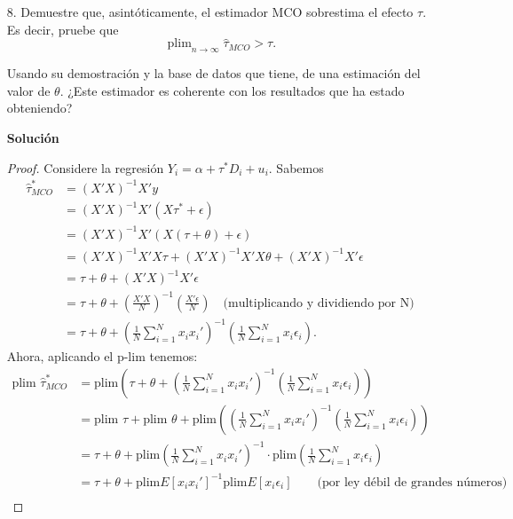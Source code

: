 \documentclass[a4paper, answers, addpoints, 11pt]{exam}
\DeclareMathOperator*{\plim}{plim}
\begin{document}
\begin{itemize}
\begin{mdframed}
        \end{mdframed}

    \item[8.] Demuestre que, asintóticamente, el estimador MCO sobrestima el efecto $\tau$. Es decir, pruebe que  
\[
\plim_{n \to \infty} \hat{\tau}_{MCO} > \tau.
\]

    Usando su demostración y la base de datos que tiene, de una estimación del valor de $\theta$. ¿Este estimador es coherente con los resultados que ha estado obteniendo?
     \begin{mdframed}
        \textbf{Solución}
        \begin{proof}
       Considere la regresión $Y_i =\alpha+ \tau^* D_i + u_i$. Sabemos 
\begin{align*}
    \hat{\tau}^*_{MCO} &=(X'X)^{-1} X' y \\
    &= (X'X)^{-1} X' (X \tau^* + \epsilon) \\
    &= (X'X)^{-1} X' (X (\tau + \theta) + \epsilon) \\
    &= (X'X)^{-1} X' X \tau + (X'X)^{-1} X' X\theta + (X'X)^{-1} X' \epsilon \\
    &= \tau + \theta + (X'X)^{-1} X' \epsilon \\
    &= \tau + \theta + \left( \frac{X'X}{N} \right)^{-1} \left( \frac{X'\epsilon}{N} \right) \quad \text{(multiplicando y dividiendo por N)} \\
    &= \tau + \theta + \left( \frac{1}{N} \sum_{i=1}^{N} x_i x_i' \right)^{-1} \left( \frac{1}{N} \sum_{i=1}^{N} x_i \epsilon_i \right).
  \end{align*}
  Ahora, aplicando el p-lim tenemos:
  \begin{align*}
    \text{plim } \hat{\tau}^*_{MCO} &= \text{plim} \left( \tau + \theta+ \left( \frac{1}{N} \sum_{i=1}^{N} x_i x_i' \right)^{-1} 
    \left( \frac{1}{N} \sum_{i=1}^{N} x_i \epsilon_i \right) \right) \\
    &= \text{plim } \tau + \text{plim } \theta +\text{plim} \left( \left( \frac{1}{N} \sum_{i=1}^{N} x_i x_i' \right)^{-1} 
    \left( \frac{1}{N} \sum_{i=1}^{N} x_i \epsilon_i \right) \right) \\
    &= \tau +\theta+ \text{plim} \left( \frac{1}{N} \sum_{i=1}^{N} x_i x_i' \right)^{-1} 
    \cdot \text{plim} \left( \frac{1}{N} \sum_{i=1}^{N} x_i \epsilon_i \right) \\
      &= \tau +\theta + \text{plim} E[x_i x_i'] ^{-1} \text{plim} E[x_i \epsilon_i] \qquad \text{(por ley débil de grandes números) }\\

\end{align*}
\end{proof}
\end{mdframed}
\end{itemize}
\end{document}
